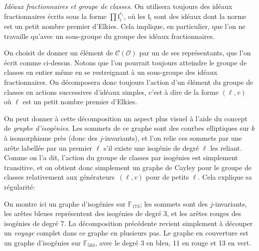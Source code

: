 \documentclass[11pt,a4paper]{article}
\newcommand{\F}{\mathbb{F}}
\renewcommand{\O}{\mathcal{O}}
\newcommand{\Cl}{\mathcal{C}}
\renewcommand{\frak}{\mathfrak}
\renewcommand{\v}{\vspace{5mm}}
\theoremstyle{definition}
\begin{document}
\emph{Idéaux fractionnaires et groupe de classes.} On utilisera toujours des idéaux fractionnaires écrits sous la forme $\prod {\frak l}_i^{r_i}$, où les ${\frak l}_i$ sont des idéaux dont la norme est un petit nombre premier d'Elkies. Cela implique, en particulier, que l'on ne travaille qu'avec un sous-groupe du groupe des idéaux fractionnaires.

On choisit de donner un élément de $\Cl(\O)$ par un de ses représentants, que l'on écrit comme ci-dessus. Notons que l'on pourrait toujours atteindre le groupe de classes en entier même en se restreignant à un sous-groupe des idéaux fractionnaires. On décomposera donc toujours l'action d'un élément du groupe de classes en actions successives d'idéaux \og simples\fg, c'est à dire de la forme $(\ell, v)$ où $\ell$ est un petit nombre premier d'Elkies.

On peut donner à cette décomposition un aspect plus visuel à l'aide du concept de \emph{graphe d'isogénies}. Les sommets de ce graphe sont des courbes elliptiques sur $k$ à isomorphisme près (donc des $j$-invariants), et l'on relie ces sommets par une arête labellée par un premier $\ell$ s'il existe une isogénie de degré $\ell$ les reliant. Comme on l'a dit, l'action du groupe de classes par isogénies est simplement transitive, et on obtient donc simplement un graphe de Cayley pour le groupe de classes relativement aux \og générateurs\fg\ $(\ell, v)$ pour de petits $\ell$. Cela explique sa régularité:

\begin{center}
\end{center}


On montre ici un graphe d'isogénies sur $\F_{173}$; les sommets sont des $j$-invariants, les arêtes bleues représentent des isogénies de degré 3, et les arêtes rouges des isogénies de degré 7. La décomposition précédente revient simplement à découper un \emph{voyage} complet dans ce graphe en plusieurs pas. Le graphe en couverture est un graphe d'isogénies sur $\F_{503}$, avec le degré 3 en bleu, 11 en rouge et 13 en vert. 
\v
\end{document}
